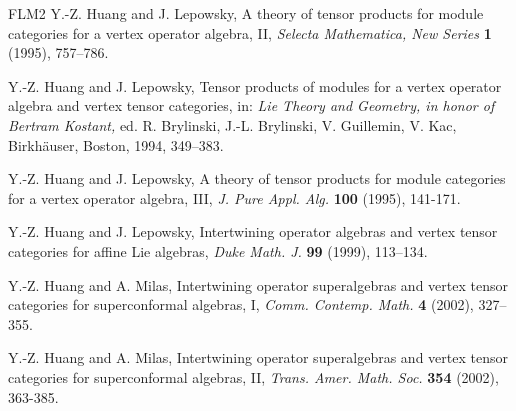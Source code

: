 \documentclass{amsproc}
\theoremstyle{definition}
\theoremstyle{remark}
\numberwithin{equation}{section}
\begin{document}
\begin{thebibliography}{FLM2}
Y.-Z. Huang and J. Lepowsky, A theory of tensor products for module
categories for a vertex operator algebra, II, {\em Selecta
Mathematica, New Series} {\bf 1} (1995), 757--786.

Y.-Z. Huang and J. Lepowsky, Tensor products of modules for a vertex
operator algebra and vertex tensor categories, in:
     {\em Lie Theory and Geometry,
in honor of Bertram Kostant,}
ed. R. Brylinski, J.-L. Brylinski, V. Guillemin, V. Kac,
Birkh\"{a}user, Boston, 1994, 349--383.

Y.-Z. Huang and J. Lepowsky, A theory of tensor products for module
categories for a vertex operator algebra, III, {\em J. Pure
Appl. Alg.} {\bf 100} (1995),  141-171.

Y.-Z. Huang and J. Lepowsky, Intertwining operator algebras and vertex
tensor categories for
affine Lie algebras,  {\it Duke Math. J.} {\bf 99} (1999), 113--134.


Y.-Z. Huang and A. Milas, Intertwining operator
superalgebras and vertex tensor categories for superconformal algebras,
I, {\it Comm. Contemp. Math.} {\bf 4} (2002), 327--355. 

Y.-Z. Huang and A. Milas, Intertwining operator
superalgebras and vertex tensor categories for superconformal algebras,
II, {\it Trans. Amer. Math. Soc.} {\bf 354} (2002), 363-385. 


\end{thebibliography}
\end{document}
